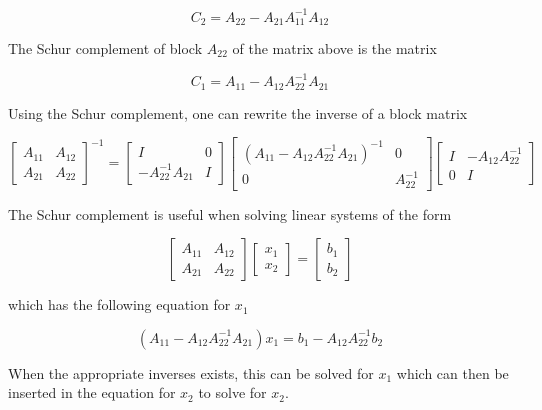 \[
   C_2 = A_{22} - A_{21}A_{11}^{-1}A_{12}
\]

The Schur complement of block $A_{22}$ of the matrix above is the matrix

\[
   C_1 = A_{11} - A_{12}A_{22}^{-1}A_{21}
\]

Using the Schur complement, one can rewrite the inverse of a block matrix

\[
   \left[ \begin{array}{c|c} A_{11} & A_{12} \\ \hline A_{21} & A_{22} \end{array} \right]^{-1}
= \left[ \begin{array}{c|c} I & 0 \\ \hline -A_{22}^{-1}A_{21} & I \end{array} \right] \left[ \begin{array}{c|c} (A_{11} - A_{12}A_{22}^{-1}A_{21})^{-1} & 0 \\ \hline 0 & A_{22}^{-1} \end{array} \right] \left[ \begin{array}{c|c} I & -A_{12}A_{22}^{-1} \\ \hline 0 & I \end{array} \right]
\]

The Schur complement is useful when solving linear systems of the form

\[
   \left[ \begin{array}{c|c} A_{11} & A_{12} \\ \hline A_{21} & A_{22} \end{array} \right] \left[ \begin{array}{c} x_1 \\ x_2 \end{array} \right] = \left[ \begin{array}{c} b_1 \\ b_2 \end{array} \right]
\]

which has the following equation for $x_1$

\[
   (A_{11} - A_{12}A_{22}^{-1}A_{21})x_1 = b_1 - A_{12}A_{22}^{-1}b_2
\]

When the appropriate inverses exists, this can be solved for $x_1$ which can then be inserted in the equation for $x_2$ to solve for $x_2$.

